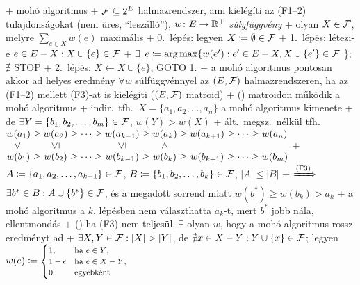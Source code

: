 
+ \alg mohó algoritmus
  + \DataIn $\mathcal{F} \subseteq 2^E$ halmazrendszer, ami kielégíti az
    (F1--2) tulajdonságokat (nem üres, ``leszálló''), $w\colon E \to
    \mathbb{R}^+$ \emph{súlyfüggvény}
  + \DataOut olyan $X \in \mathcal{F}$, melyre $\sum_{e \in X} w(e)$ maximális
  + 0.~lépés: legyen $X \coloneqq \emptyset \in \mathcal{F}$
  + 1.~lépés: létezi-e $ e \in E - X: X \cup \{ e \} \in \mathcal{F}$
    + $\exists$ \RA $e \coloneqq \operatorname*{arg\,max} \{ w(e') : e' \in E - X, X
    \cup \{ e' \} \in \mathcal{F}$ \}; $\nexists$ \RA STOP
  + 2.~lépés: $X \gets X \cup \{ e \}$, GOTO 1.
+ \thm a mohó algoritmus pontosan akkor ad helyes eredmény $\forall w$
  súlfüggvénnyel az $(E, \mathcal{F})$ halmazrendszeren, ha az (F1--2) mellett
  (F3)-at is kielégíti ($(E, \mathcal{F})$ matroid)
  + \proof (\LA) matroidon működik a mohó algoritmus
    + indir.~tfh.~$X = \{a_1, a_2, \ldots, a_n\}$ a mohó algoritmus
      kimenete
    + de $\exists Y = \{b_1, b_2, \ldots, b_m\} \in \mathcal{F}$, $w(Y) >
      w(X)$
    + ált.~megsz.~nélkül tfh.~{\footnotesize$\begin{array}{@{}*{10}{c@{\;}}c@{}}
        w(a_1) & \ge & w(a_2) & \ge\cdots\ge & w(a_{k - 1}) & \ge & w(a_k) & \ge & w(a_{k + 1})
        & \ge\cdots\ge & w(a_n) \\
        \vertle & & \vertle & & \vertle & & \vertgt & & & & \\
        w(b_1) & \ge & w(b_2) & \ge\cdots\ge & w(b_{k - 1}) & \ge & w(b_k) & \ge & w(b_{k + 1})
        & \ge\cdots\ge & w(b_m)
      \end{array}$}
    + $A \coloneqq \{ a_1, a_2, \ldots, a_{k - 1} \} \in \mathcal{F}$, $B \coloneqq \{
      b_1, b_2, \ldots, b_k \} \in \mathcal{F}$, $\lvert A \rvert \le \lvert B \rvert$
      + $\xRightarrow{\text{(F3)}}$ $\exists b^* \in B : A \cup \{ b^* \}
        \in \mathcal{F}$, és a megadott sorrend miatt $w(b^*) \ge w(b_k) > a_k$
      + a mohó algoritmus a $k$. lépésben nem választhatta $a_k$-t,
        mert $b^*$ jobb nála, ellentmondás
  + (\RA) ha (F3) nem teljesül, $\exists$ olyan $w$, hogy a mohó
    algoritmus rossz eredményt ad
    + $\exists X, Y \in \mathcal{F} : \lvert X \rvert > \lvert Y \rvert$, de
      $\nexists x \in X - Y : Y \cup \{ x \} \in \mathcal{F}$;
      legyen $w(e) \coloneqq \text{\footnotesize$\begin{cases}
        1, &\text{ha $e \in Y$,} \\
        1 - \epsilon &\text{ha $e \in X - Y$,} \\
        0 & \text{egyébként}
      \end{cases}$}$
